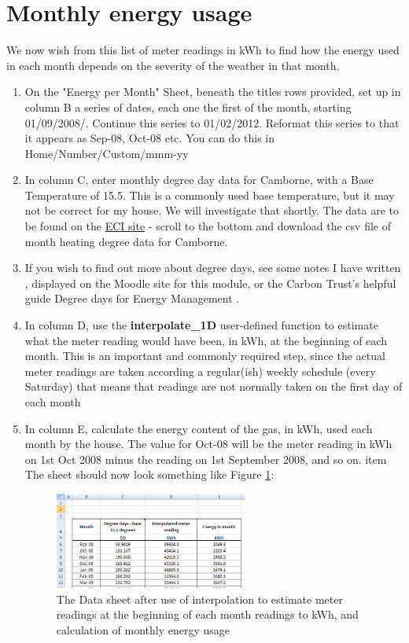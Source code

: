 \documentclass{article}
\begin{document}
\section{Monthly energy usage}
We now wish from this list of meter readings in kWh to find how the energy used in each month depends on the severity of the weather in that month.
\begin{enumerate}
\item On the "Energy per Month" Sheet, beneath the titles rows provided, set up in column B a series of dates, each one the first of the month,  starting 01/09/2008/. Continue this series to 01/02/2012. Reformat this series to that it appears as Sep-08, Oct-08 etc. You can do this in Home/Number/Custom/mmm-yy
\item In column C, enter monthly degree day data for Camborne, with a Base Temperature of 15.5\degree. This is a commonly used base temperature, but it may not be correct for my house. We will investigate that shortly. The data are to be found on the \href{http://www.eci.ox.ac.uk/research/energy/degreedays.php}{ECI site} \cite{ECIOxfordUniversity2014} - scroll to the bottom and download the csv file of month heating degree data for Camborne.
\item If you wish to find out more about degree days, see some notes I have written , displayed on the Moodle site for this module, or the Carbon Trust's helpful guide Degree days for Energy Management \cite{CarbonTrust2012}.
\item In column D, use the \textbf{interpolate\_1D} user-defined function to estimate what the meter reading would have been, in kWh, at the beginning of each month. This is an important and commonly required step, since the actual meter readings are taken according a regular(ish) weekly schedule (every Saturday) that means that readings are not normally taken on the first day of each month
\item In column E, calculate the energy content of the gas, in kWh, used each month by the house. The value for Oct-08 will be the meter reading in kWh on 1st Oct 2008 minus the reading on 1st September 2008, and so on.
item The sheet should now look something like Figure \ref{fig:EPMsheet}:

\begin{figure}
\includegraphics[width=0.6\textwidth]{SEM_L1_im_001}
\caption{The Data sheet after use of interpolation to estimate meter readings at the beginning of each month readings to kWh, and calculation of monthly energy usage}
\label{fig:EPMsheet}
\end{figure}


\end{enumerate}
\end{document}
